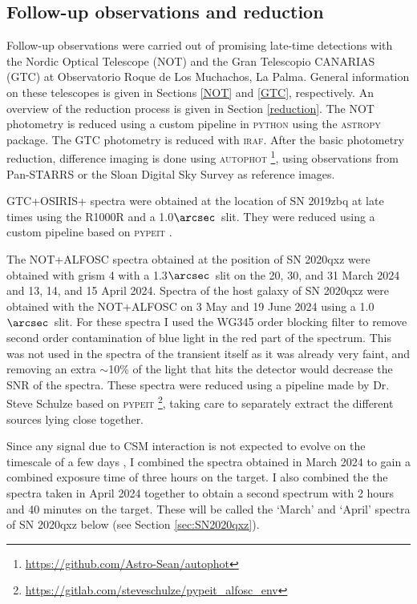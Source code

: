 \documentclass[a4paper,oneside,12pt, class=Latex/Classes/PhDthesisPSnPDF, crop=false]{standalone}
\begin{document}
\subsection{Follow-up observations and reduction}
\label{sec:reduction}
Follow-up observations were carried out of promising late-time detections with the Nordic Optical Telescope (NOT) and the Gran Telescopio CANARIAS (GTC) at Observatorio Roque de Los Muchachos, La Palma. General information on these telescopes is given in Sections \ref{NOT} and \ref{GTC}, respectively. An overview of the reduction process is given in Section \ref{reduction}. The NOT photometry is reduced using a custom pipeline in \textsc{python} using the \textsc{astropy} package. The GTC photometry is reduced with \textsc{iraf}. After the basic photometry reduction, difference imaging is done using \textsc{autophot} \cite{Autophot}\footnote{\url{https://github.com/Astro-Sean/autophot}}, using observations from Pan-STARRS \citep{Pan-STARRS1} or the Sloan Digital Sky Survey \citep[SDSS, ][]{SDSS-I-II, SDSS_DR4, SDSS_telescope} as reference images. 

GTC+OSIRIS+ spectra were obtained at the location of SN 2019zbq at late times using the R1000R and a 1.0$\arcsec$\ slit. They were reduced using a custom pipeline based on \textsc{pypeit} \citep{pypeit:joss_pub, pypeit:zenodo}. 

The NOT+ALFOSC spectra obtained at the position of SN 2020qxz were obtained with grism 4 with a 1.3$\arcsec$\ slit on the 20, 30, and 31 March 2024 and 13, 14, and 15 April 2024. Spectra of the host galaxy of SN 2020qxz were obtained with the NOT+ALFOSC on 3 May and 19 June 2024 using a 1.0$\arcsec$\ slit. For these spectra I used the WG345 order blocking filter to remove second order contamination of blue light in the red part of the spectrum. This was not used in the spectra of the transient itself as it was already very faint, and removing an extra $\sim$10\% of the light that hits the detector would decrease the SNR of the spectra. These spectra were reduced using a pipeline made by Dr. Steve Schulze based on \textsc{pypeit} \footnote{\url{https://gitlab.com/steveschulze/pypeit_alfosc_env}}, taking care to separately extract the different sources lying close together.

Since any signal due to CSM interaction is not expected to evolve on the timescale of a few days \citep[e.g.,][]{2015cp}, I combined the spectra  obtained in March 2024 to gain a combined exposure time of three hours on the target. I also combined the the spectra taken in April 2024 together to obtain a second spectrum with 2 hours and 40 minutes on the target. These will be called the `March' and `April' spectra of SN 2020qxz below (see Section \ref{sec:SN2020qxz}).
\end{document}
